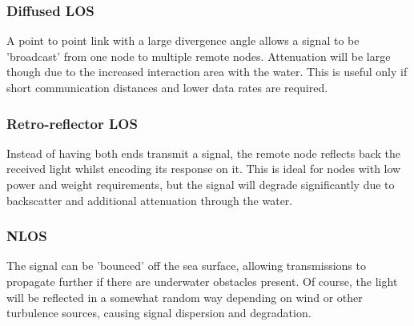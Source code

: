 \subsubsection{Diffused \ac{LOS}}
A point to point link with a large divergence angle allows a signal to be
'broadcast' from one node to multiple remote nodes. Attenuation will be large
though due to the increased interaction area with the water. This is useful
only if short communication distances and lower data rates are required.

\subsubsection{Retro-reflector \ac{LOS}}
Instead of having both ends transmit a signal, the remote node reflects back
the received light whilst encoding its response on it. This is ideal for nodes
with low power and weight requirements, but the signal will degrade
significantly due to backscatter and additional attenuation through the water.

\subsubsection{\ac{NLOS}}
The signal can be 'bounced' off the sea surface, allowing transmissions to
propagate further if there are underwater obstacles present. Of course, the
light will be reflected in a somewhat random way depending on wind or other
turbulence sources, causing signal dispersion and degradation.

